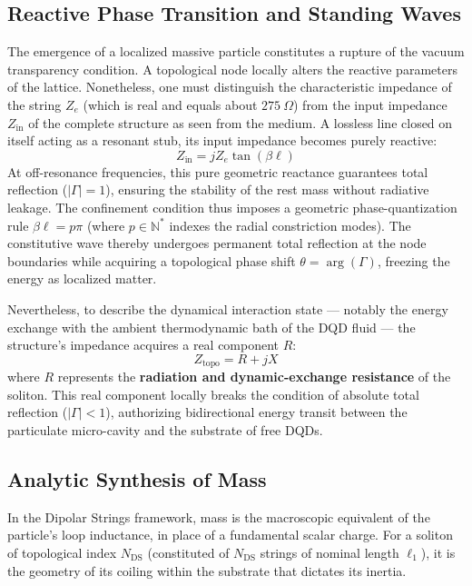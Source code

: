 \documentclass[11pt,a4paper]{article}
\theoremstyle{plain}
\theoremstyle{remark}
\newcommand{\Ncd}{\ensuremath{N_{\mathrm{DS}}}}
\begin{document}
\subsection{Reactive Phase Transition and Standing Waves}
The emergence of a localized massive particle constitutes a rupture of the vacuum transparency condition. A topological node locally alters the reactive parameters of the lattice. Nonetheless, one must distinguish the characteristic impedance of the string $Z_e$ (which is real and equals about $275~\Omega$) from the input impedance $Z_{\text{in}}$ of the complete structure as seen from the medium. A lossless line closed on itself acting as a resonant stub, its input impedance becomes purely reactive:
\begin{equation}\label{eq:Zin_stub}
Z_{\text{in}} = j Z_e \tan(\beta \ell)
\end{equation}
At off-resonance frequencies, this pure geometric reactance guarantees total reflection ($|\Gamma| = 1$), ensuring the stability of the rest mass without radiative leakage. The confinement condition thus imposes a geometric phase-quantization rule $\beta \ell = p\pi$ (where $p \in \mathbb{N}^*$ indexes the radial constriction modes). The constitutive wave thereby undergoes permanent total reflection at the node boundaries while acquiring a topological phase shift $\theta = \arg(\Gamma)$, freezing the energy as localized matter.

Nevertheless, to describe the dynamical interaction state --- notably the energy exchange with the ambient thermodynamic bath of the DQD fluid --- the structure's impedance acquires a real component $R$:
\begin{equation}
Z_{\text{topo}} = R + jX
\end{equation}
where $R$ represents the \textbf{radiation and dynamic-exchange resistance} of the soliton. This real component locally breaks the condition of absolute total reflection ($|\Gamma| < 1$), authorizing bidirectional energy transit between the particulate micro-cavity and the substrate of free DQDs.

\subsection{Analytic Synthesis of Mass}

In the Dipolar Strings framework, mass is the macroscopic equivalent of the particle's loop inductance, in place of a fundamental scalar charge. For a soliton of topological index $\Ncd$ (constituted of $\Ncd$ strings of nominal length $\ell_1$), it is the geometry of its coiling within the substrate that dictates its inertia.
\end{document}
